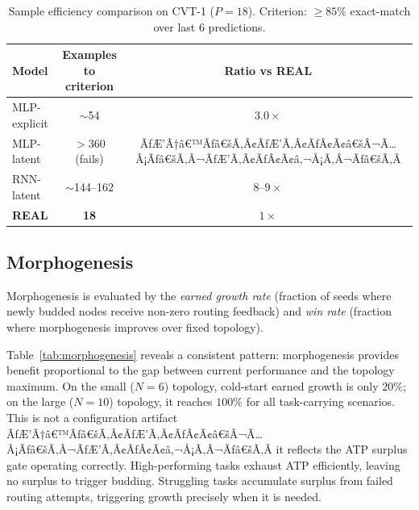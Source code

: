 \documentclass[10pt,twocolumn]{article}
\begin{document}
\begin{table}[t]
\centering
\caption{Sample efficiency comparison on CVT-1 ($P=18$).
  Criterion: $\geq\!85\%$ exact-match over last 6 predictions.}
\label{tab:neural}
\small
\begin{tabular}{lcc}
\toprule
Model & Examples to criterion & Ratio vs REAL \\
\midrule
MLP-explicit       & $\sim$54 & $3.0\times$ \\
MLP-latent         & $>$360 (fails) & ÃƒÆ’Ã†â€™Ãƒâ€šÃ‚Â¢ÃƒÆ’Ã‚Â¢ÃƒÂ¢Ã¢â€šÂ¬Ã…Â¡Ãƒâ€šÃ‚Â¬ÃƒÆ’Ã‚Â¢ÃƒÂ¢Ã¢â‚¬Å¡Ã‚Â¬Ãƒâ€šÃ‚Â \\
RNN-latent         & $\sim$144--162 & $8$--$9\times$ \\
\midrule
\textbf{REAL}      & \textbf{18} & $1\times$ \\
\bottomrule
\end{tabular}
\end{table}

\subsection{Morphogenesis}
\label{sec:morphogenesis}

Morphogenesis is evaluated by the \emph{earned growth rate}
(fraction of seeds where newly budded nodes receive non-zero routing feedback)
and \emph{win rate} (fraction where morphogenesis improves over fixed topology).

Table~\ref{tab:morphogenesis} reveals a consistent pattern:
morphogenesis provides benefit proportional to the gap between current
performance and the topology maximum.
On the small ($N\!=\!6$) topology, cold-start earned growth is only $20\%$;
on the large ($N\!=\!10$) topology, it reaches $100\%$ for all task-carrying
scenarios.
This is not a configuration artifact ÃƒÆ’Ã†â€™Ãƒâ€šÃ‚Â¢ÃƒÆ’Ã‚Â¢ÃƒÂ¢Ã¢â€šÂ¬Ã…Â¡Ãƒâ€šÃ‚Â¬ÃƒÆ’Ã‚Â¢ÃƒÂ¢Ã¢â‚¬Å¡Ã‚Â¬Ãƒâ€šÃ‚Â it reflects the ATP surplus gate
operating correctly.
High-performing tasks exhaust ATP efficiently, leaving no surplus to trigger
budding.
Struggling tasks accumulate surplus from failed routing attempts, triggering
growth precisely when it is needed.
\end{document}
